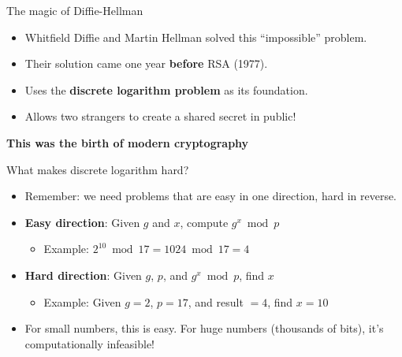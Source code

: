 \documentclass[aspectratio=169, lualatex, handout]{beamer}
\begin{document}
\begin{frame}{The magic of Diffie-Hellman}
	\begin{itemize}[<+->]
		\item Whitfield Diffie and Martin Hellman solved this ``impossible'' problem.
		\item Their solution came one year \textbf{before} RSA (1977).
		\item Uses the \textbf{discrete logarithm problem} as its foundation.
		\item Allows two strangers to create a shared secret in public!
	\end{itemize}
	\vspace{0.5cm}
	\begin{center}
		\Large\textbf{This was the birth of modern cryptography}
	\end{center}
\end{frame}

\begin{frame}{What makes discrete logarithm hard?}
	\begin{itemize}[<+->]
		\item Remember: we need problems that are easy in one direction, hard in reverse.
		\item \textbf{Easy direction}: Given $g$ and $x$, compute $g^x \bmod p$
		      \begin{itemize}
			      \item Example: $2^{10} \bmod 17 = 1024 \bmod 17 = 4$
		      \end{itemize}
		\item \textbf{Hard direction}: Given $g$, $p$, and $g^x \bmod p$, find $x$
		      \begin{itemize}
			      \item Example: Given $g = 2$, $p = 17$, and result $= 4$, find $x = 10$
		      \end{itemize}
		\item For small numbers, this is easy. For huge numbers (thousands of bits), it's computationally infeasible!
	\end{itemize}
\end{frame}
\end{document}

